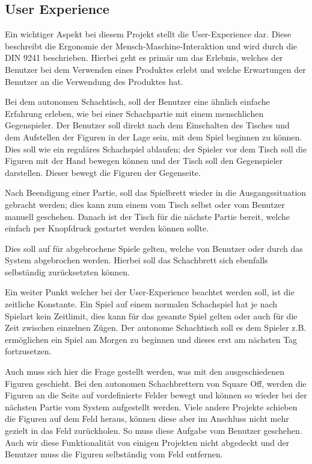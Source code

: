\hypertarget{user-experience}{%
\subsection{User Experience}\label{user-experience}}

Ein wichtiger Aspekt bei diesem Projekt stellt die User-Experience dar.
Diese beschreibt die Ergonomie der Mensch-Maschine-Interaktion und wird
durch die DIN 9241\cite{din9241} beschrieben. Hierbei geht es primär
um das Erlebnis, welches der Benutzer bei dem Verwenden eines Produktes
erlebt und welche Erwartungen der Benutzer an die Verwendung des
Produktes hat.

Bei dem autonomen Schachtisch, soll der Benutzer eine ähnlich einfache
Erfahrung erleben, wie bei einer Schachpartie mit einem menschlichen
Gegenspieler. Der Benutzer soll direkt nach dem Einschalten des Tisches
und dem Aufstellen der Figuren in der Lage sein, mit dem Spiel beginnen
zu können. Dies soll wie ein reguläres Schachspiel ablaufen; der Spieler
vor dem Tisch soll die Figuren mit der Hand bewegen können und der Tisch
soll den Gegenspieler darstellen. Dieser bewegt die Figuren der
Gegenseite.

Nach Beendigung einer Partie, soll das Spielbrett wieder in die
Ausgangssituation gebracht werden; dies kann zum einem vom Tisch selbst
oder vom Benutzer manuell geschehen. Danach ist der Tisch für die
nächste Partie bereit, welche einfach per Knopfdruck gestartet werden
können sollte.

Dies soll auf für abgebrochene Spiele gelten, welche von Benutzer oder
durch das System abgebrochen werden. Hierbei soll das Schachbrett sich
ebenfalls selbständig zurücksetzten können.

Ein weiter Punkt welcher bei der User-Experience beachtet werden soll,
ist die zeitliche Konstante. Ein Spiel auf einem normalen Schachspiel
hat je nach Spielart kein Zeitlimit, dies kann für das gesamte Spiel
gelten oder auch für die Zeit zwischen einzelnen Zügen. Der autonome
Schachtisch soll es dem Spieler z.B. ermöglichen ein Spiel am Morgen zu
beginnen und dieses erst am nächsten Tag fortzusetzen.

Auch muss sich hier die Frage gestellt werden, was mit den
ausgeschiedenen Figuren geschieht. Bei den autonomen Schachbrettern von
Square Off\cite{squareoffgrand}, werden die Figuren an die Seite auf
vordefinierte Felder bewegt und können so wieder bei der nächsten Partie
vom System aufgestellt werden. Viele andere Projekte schieben die
Figuren auf dem Feld heraus, können diese aber im Anschluss nicht mehr
gezielt in das Feld zurückholen. So muss diese Aufgabe vom Benutzer
geschehen. Auch wir diese Funktionalität von einigen Projekten nicht
abgedeckt und der Benutzer muss die Figuren selbständig vom Feld
entfernen.

